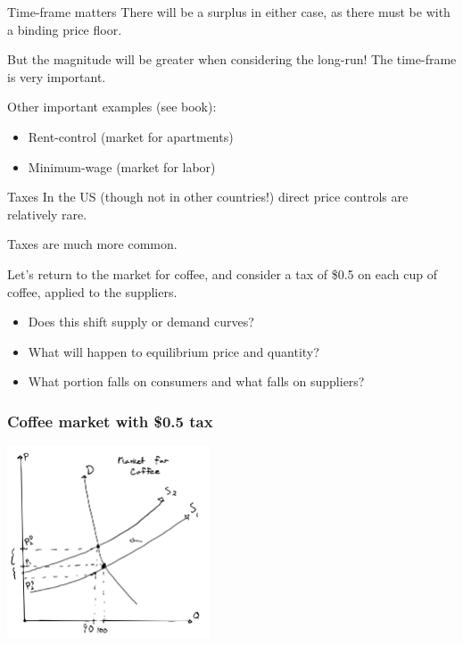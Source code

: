 \documentclass[aspectratio=169]{beamer}
\begin{document}
\begin{frame}{Time-frame matters}
    There will be a surplus in either case, as there must be with a binding price floor.

    \vspace{5mm}

    But the magnitude will be greater when considering the long-run! The time-frame is very important.

    \vspace{5mm}

    Other important examples (see book):
    \begin{itemize}
        \item Rent-control (market for apartments)
        \item Minimum-wage (market for labor)
    \end{itemize}
\end{frame}

\begin{frame}{Taxes}
    In the US (though not in other countries!) direct price controls are relatively rare.

    \vspace{5mm}

    Taxes are much more common.

    \vspace{5mm}

    Let's return to the market for coffee, and consider a tax of \$0.5 on each cup of coffee, applied to the suppliers.

    \begin{itemize}
        \item Does this shift supply or demand curves?
        \item What will happen to equilibrium price and quantity?
        \item What portion falls on consumers and what falls on suppliers?
    \end{itemize}
\end{frame}

\begin{frame}
    \frametitle{Coffee market with \$0.5 tax}
    \centering
    \includegraphics[width = 0.45\textwidth,keepaspectratio]{coffee_tax_1.png}
\end{frame}
\end{document}
